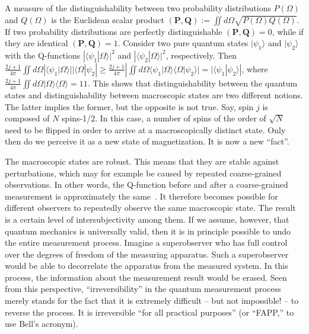 \documentclass[12pt]{article}
\newcommand{\unit}{1\!\!1}
\begin{document}
A measure of the distinguishability between two probability distributions $P(\Omega)$ and $Q(\Omega)$ is the Euclidean scalar product $({\mathbf P},{\mathbf Q}) := \iint d\Omega \sqrt{ P(\Omega) Q(\Omega)}$. If two probability distributions are perfectly distinguishable $({\mathbf P},{\mathbf Q})= 0$, while if they are identical $({\mathbf P},{\mathbf Q})=1$. Consider two pure quantum states $|\psi_1\rangle$ and $|\psi_2\rangle$ with the Q-functions $|\langle \psi_1 |\Omega\rangle |^2$ and $|\langle \psi_2 |\Omega\rangle |^2$, respectively. Then $ \frac{2j+1}{4\pi} \iint d\Omega \left| \langle \psi_1|\Omega\rangle| |\langle \Omega \right|\psi_2| \geq \frac{2j+1}{4\pi} |\iint d\Omega \langle \psi_1 |\Omega\rangle \langle \Omega|\psi_2 \rangle| =|\langle \psi_1|\psi_2 \rangle|$, where $\frac{2j+1}{4\pi}\iint d\Omega |\Omega\rangle \langle\Omega \rangle =\unit$. This shows that distinguishability between the quantum states and distinguishability between macroscopic states are two different notions. The latter implies the former, but the opposite is not true. Say, spin $j$ is composed of $N$ spins-1/2. In this case, a number of spins of the order of $\sqrt{N}$ need to be flipped in order to arrive at a macroscopically distinct state. Only then do we perceive it as a new state of magnetization. It is now a new ``fact''.

The macroscopic states are robust. This means that they are stable against perturbations, which may for example be caused by repeated coarse-grained observations. In other words, the Q-function before and after a coarse-grained measurement is approximately the same~\cite{kofler2}. It therefore becomes possible for different observers to repeatedly observe the same macroscopic state. The result is a certain level of intersubjectivity among them. If we assume, however, that quantum mechanics is universally valid, then it is in principle possible to undo the entire measurement process. Imagine a superobserver who has full control over the degrees of freedom of the measuring apparatus. Such a superobserver would be able to decorrelate the apparatus from the measured system. In this process, the information about the measurement result would be erased. Seen from this perspective, ``irreversibility'' in the quantum measurement process merely stands for the fact that it is extremely difficult -- but not impossible! -- to reverse the process. It is irreversible ``for all practical purposes'' (or ``FAPP,'' to use Bell's acronym). 
\end{document}
